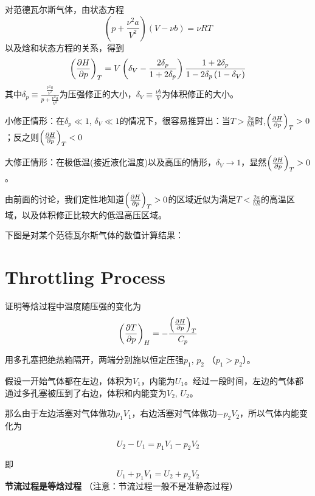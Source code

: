 \documentclass[CJK]{beamer}
\begin{document}
\begin{frame}
\bch
{\small

对范德瓦尔斯气体，由状态方程
$$\left(p + \frac{\nu^2 a}{V^2}\right) \left(V - \nu b\right) = \nu RT$$
以及焓和状态方程的关系，得到
$$\left(\frac{\partial H}{\partial p}\right)_{T} = V \left(\delta_V - \frac{2\delta_p}{1+2\delta_p}\right) \frac{1+2\delta_p}{1-2\delta_p\left(1-\delta_V\right)}$$
其中$\delta_p \equiv \frac{\frac{\nu^2a}{V^2}}{p+\frac{\nu^2 a}{V^2}}$为压强修正的大小，$\delta_V\equiv \frac{\nu b}{V}$为体积修正的大小。

\bitem
\item{小修正情形：在$\delta_p \ll 1$, $\delta_V \ll 1$的情况下，很容易推算出：当$T>\frac{2a}{bR}$时,$\left(\frac{\partial H}{\partial p}\right)_{T}>0$；反之则$\left(\frac{\partial H}{\partial p}\right)_{T}<0$}
\item{大修正情形：在极低温(接近液化温度)以及高压的情形，$\delta_V\rightarrow 1$，显然$\left(\frac{\partial H}{\partial p}\right)_{T}>0$。}
\eitem

}
\ech
\end{frame}



\begin{frame}
\bch
由前面的讨论，我们定性地知道$\left(\frac{\partial H}{\partial p}\right)_{T}>0$的区域近似为满足$T<\frac{2a}{bR}$的高温区域，以及体积修正比较大的低温高压区域。

下图是对某个范德瓦尔斯气体的数值计算结果：

\ech
\end{frame}

\section{Throttling Process}


\begin{frame}
\bch
{}
证明等焓过程中温度随压强的变化为
{\blue
$$\left(\frac{\partial T}{\partial p}\right)_{H} = - \frac{\left(\frac{\partial H}{\partial p}\right)_{T}}{C_p}$$
}
\ech
\end{frame}



\begin{frame}
\bch

\emini
{}
用多孔塞把绝热箱隔开，两端分别施以恒定压强$p_1$, $p_2$ （$p_1>p_2$）。
\emini

{\small

假设一开始气体都在左边，体积为$V_1$，内能为$U_1$。经过一段时间，左边的气体都通过多孔塞被压到了右边，体积和内能变为$V_2$, $U_2$。

那么由于左边活塞对气体做功$p_1V_1$，右边活塞对气体做功$-p_2V_2$，所以气体内能变化为

$$U_2 - U_1  = p_1V_1 - p_2V_2$$

即
$$ U_1 + p_1V_1 = U_2 + p_2V_2 $$
{\blue \bf 节流过程是等焓过程} （注意：节流过程一般不是准静态过程）

}
\ech
\end{frame}
\end{document}
